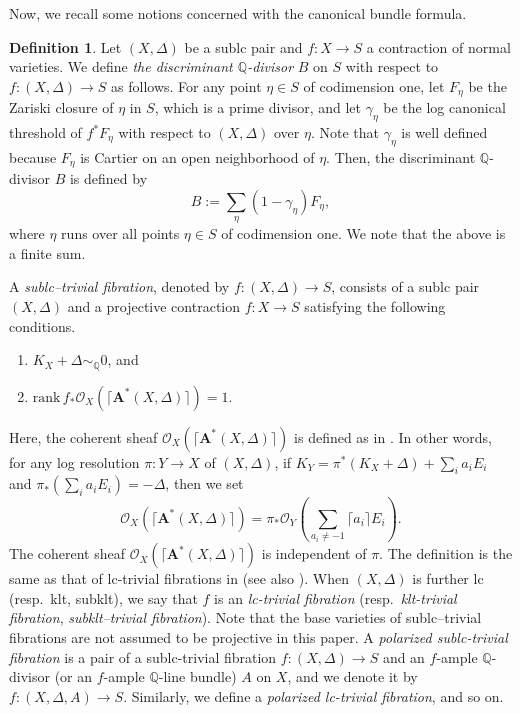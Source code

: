 \documentclass[12pt,twoside]{amsart}
\theoremstyle{definition}
\newtheorem{defn}[thm]{Definition}
\begin{document}
Now, we recall some notions concerned with the canonical bundle formula.
\begin{defn}\label{defn--can-bundle-formula}
    Let $(X,\Delta)$ be a sublc pair and $f\colon  X\to S$ a contraction of normal varieties.
    We define {\em the discriminant $\mathbb{Q}$-divisor} $B$ on $S$ with respect to $f\colon (X,\Delta)\to S$ as follows.
    For any point $\eta\in S$ of codimension one, let $F_{\eta}$ be the Zariski closure of $\eta$ in $S$, which is a prime divisor, and let $\gamma_\eta$ be the log canonical threshold of $f^{*}F_{\eta}$ with respect to $(X,\Delta)$ over $\eta$. 
Note that $\gamma_{\eta}$ is well defined because $F_{\eta}$ is Cartier on an open neighborhood of $\eta$.   
    Then, the discriminant $\mathbb{Q}$-divisor $B$ is defined by 
    \[
    B:=\sum_{\eta}(1-\gamma_\eta)F_{\eta},
    \]
    where $\eta$ runs over all points $\eta\in S$ of codimension one.
    We note that the above is a finite sum.

    
  A {\em sublc--trivial fibration}, denoted by $f\colon (X,\Delta)\to S$, consists of a sublc pair $(X,\Delta)$ and a projective contraction $f \colon X \to S$ satisfying the following conditions.
    \begin{enumerate}
        \item $K_X+\Delta\sim_{\mathbb{Q}}0$, and
        \item $\mathrm{rank}\,f_*\mathcal{O}_X(\lceil \mathbf{A}^*(X,\Delta)\rceil)=1$.
    \end{enumerate}
    Here, the coherent sheaf $\mathcal{O}_X(\lceil \mathbf{A}^*(X,\Delta)\rceil)$ is defined as in \cite[Lemma 3.22]{fujino-bpf}. 
    In other words, for any log resolution $\pi\colon Y\to X$ of $(X,\Delta)$, if $K_Y=\pi^*(K_X+\Delta)+\sum_ia_iE_i$ and $\pi_*(\sum_ia_iE_i)=-\Delta$, then we set
 \[
\mathcal{O}_X(\lceil \mathbf{A}^*(X,\Delta)\rceil)=\pi_*\mathcal{O}_Y\left(\sum_{a_i\ne-1}\lceil a_i\rceil E_i\right).
\]
The coherent sheaf $\mathcal{O}_X(\lceil \mathbf{A}^*(X,\Delta)\rceil)$ is independent of $\pi$. 
The definition is the same as that of lc-trivial fibrations in \cite[Section 2]{FG} (see also \cite{A}). 
When $(X,\Delta)$ is further lc (resp.~klt, subklt), we say that $f$ is an {\em lc-trivial fibration} (resp.~{\em klt-trivial fibration}, {\em subklt--trivial fibration}). 
 Note that the base varieties of sublc--trivial fibrations are not assumed to be projective in this paper. 
 A {\em polarized sublc-trivial fibration} is a pair of a sublc-trivial fibration $f\colon (X,\Delta)\to S$ and an $f$-ample $\mathbb{Q}$-divisor (or an $f$-ample $\mathbb{Q}$-line bundle) $A$ on $X$, and we denote it by $f\colon (X,\Delta,A)\to S$. 
Similarly, we define a {\em polarized lc-trivial fibration}, and so on.  


\end{defn}
\end{document}
